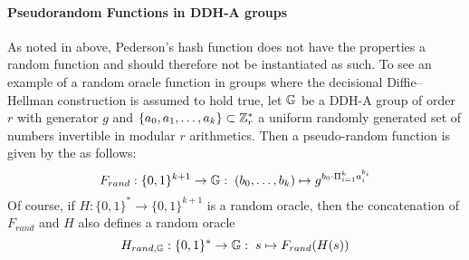 \paragraph{Pseudorandom Functions in DDH-A groups}
As noted in above, Pederson's hash function does not have the properties a random function and should therefore not be instantiated as such. To see an example of a random oracle function in groups where the decisional Diffie--Hellman construction is assumed to hold true, let $\mathbb{G}$ be a DDH-A group of order $r$ with generator $g$ and $\{a_0,a_1,\ldots,a_k\}\subset \mathbb{Z}_{r}^*$ a uniform randomly generated set of numbers invertible in modular $r$ arithmetics. Then a pseudo-random function is given by the as follows:
\begin{equation}
F_{rand}: \{0,1\}^{k+1} \to \mathbb{G}:\; (b_0,\ldots,b_k)\mapsto g^{b_0\cdot \Pi_{i=1}^k a_i^{b_i}}
\end{equation}
Of course, if $H:\{0,1\}^*\to \{0,1\}^{k+1}$ is a random oracle, then the concatenation of $F_{rand}$ and $H$ also defines a random oracle
\begin{equation}
H_{rand,\mathbb{G}}:\{0,1\}^* \to \mathbb{G}:\; s\mapsto F_{rand}(H(s))
\end{equation}




